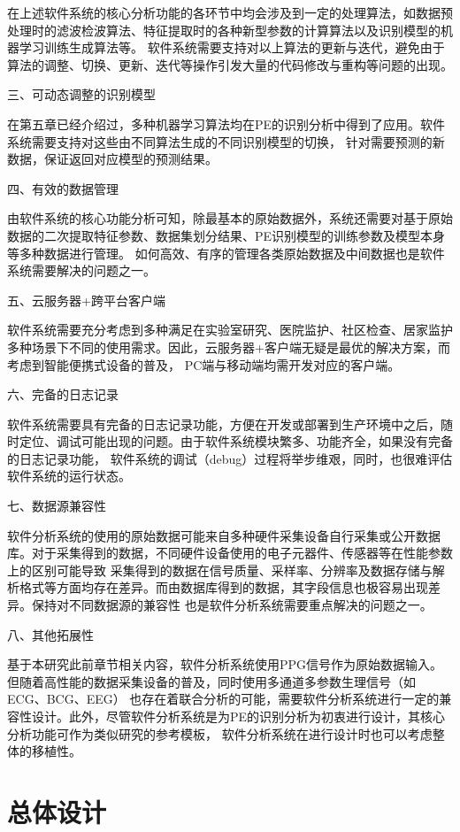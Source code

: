 在上述软件系统的核心分析功能的各环节中均会涉及到一定的处理算法，如数据预处理时的滤波检波算法、特征提取时的各种新型参数的计算算法以及识别模型的机器学习训练生成算法等。
软件系统需要支持对以上算法的更新与迭代，避免由于算法的调整、切换、更新、迭代等操作引发大量的代码修改与重构等问题的出现。

三、可动态调整的识别模型

在第五章已经介绍过，多种机器学习算法均在PE的识别分析中得到了应用。软件系统需要支持对这些由不同算法生成的不同识别模型的切换，
针对需要预测的新数据，保证返回对应模型的预测结果。

四、有效的数据管理

由软件系统的核心功能分析可知，除最基本的原始数据外，系统还需要对基于原始数据的二次提取特征参数、数据集划分结果、PE识别模型的训练参数及模型本身等多种数据进行管理。
如何高效、有序的管理各类原始数据及中间数据也是软件系统需要解决的问题之一。

五、云服务器+跨平台客户端

软件系统需要充分考虑到多种满足在实验室研究、医院监护、社区检查、居家监护多种场景下不同的使用需求。因此，云服务器+客户端无疑是最优的解决方案，而考虑到智能便携式设备的普及，
PC端与移动端均需开发对应的客户端。

六、完备的日志记录

软件系统需要具有完备的日志记录功能，方便在开发或部署到生产环境中之后，随时定位、调试可能出现的问题。由于软件系统模块繁多、功能齐全，如果没有完备的日志记录功能，
软件系统的调试（debug）过程将举步维艰，同时，也很难评估软件系统的运行状态。

七、数据源兼容性

软件分析系统的使用的原始数据可能来自多种硬件采集设备自行采集或公开数据库。对于采集得到的数据，不同硬件设备使用的电子元器件、传感器等在性能参数上的区别可能导致
采集得到的数据在信号质量、采样率、分辨率及数据存储与解析格式等方面均存在差异。而由数据库得到的数据，其字段信息也极容易出现差异。保持对不同数据源的兼容性
也是软件分析系统需要重点解决的问题之一。

八、其他拓展性

基于本研究此前章节相关内容，软件分析系统使用PPG信号作为原始数据输入。但随着高性能的数据采集设备的普及，同时使用多通道多参数生理信号（如ECG、BCG、EEG）
也存在着联合分析的可能，需要软件分析系统进行一定的兼容性设计。此外，尽管软件分析系统是为PE的识别分析为初衷进行设计，其核心分析功能可作为类似研究的参考模板，
软件分析系统在进行设计时也可以考虑整体的移植性。

\section{总体设计}


